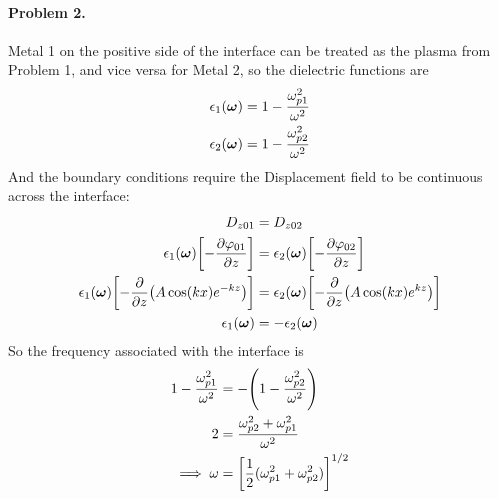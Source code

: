 \documentclass[../main.tex]{subfiles}
\begin{document}
\paragraph*{Problem 2.} Metal 1 on the positive side of the interface can be treated as the plasma
from Problem 1, and vice versa for Metal 2, so the dielectric functions are
\begin{align*}
    \epsilon_1(\vb* \omega) &= 1 - \frac{\omega_{p1}^2}{\omega^2} \\
    \epsilon_2(\vb* \omega) &= 1 - \frac{\omega_{p2}^2}{\omega^2}
\end{align*}
And the boundary conditions require the Displacement field to be continuous across the interface:
\begin{align*}
    D_{z01} &= D_{z02} \\
    \epsilon_1(\vb*\omega) \qt[-\pdv{\varphi_{01}}{z}] &= \epsilon_2(\vb*\omega) \qt[-\pdv{\varphi_{02}}{z}] \\
    \epsilon_1(\vb*\omega) \qt[- \pdv{z}(A \cos(kx) e^{-kz})] &=
    \epsilon_2(\vb*\omega) \qt[- \pdv{z}(A \cos(kx) e^{kz})] \\
    \epsilon_1(\vb*\omega) &= -\epsilon_2(\vb*\omega)
\end{align*}
So the frequency associated with the interface is
\begin{align*}
    1 - \frac{\omega_{p1}^2}{\omega^2} &= -\qt(1 - \frac{\omega_{p2}^2}{\omega^2}) \\
    2 &= \frac{\omega_{p2}^2 + \omega_{p1}^2}{\omega^2} \\
    \implies \omega &= \qt[\frac{1}{2}(\omega_{p1}^2 + \omega_{p2}^2)]^{1/2}
\end{align*}
\end{document}
